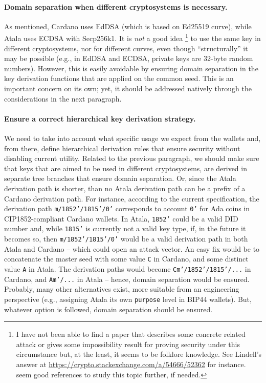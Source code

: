 \paragraph{Domain separation when different cryptosystems is
  necessary.} %
As mentioned, Cardano uses EdDSA (which is based on Ed25519 curve),
while Atala uses ECDSA with Secp256k1. It is \emph{not} a good idea%
\footnote{I have not been able to find a paper that describes
  some concrete related attack or gives some impossibility result for
  proving security under this circumstance but, at the least, it seems to
  be folklore knowledge. See Lindell's answer at
  \url{https://crypto.stackexchange.com/a/54666/52362} for instance.
  \cite{dlp12+,thorm21} seem good references to study this topic further, if
  needed.} to use the same key in different cryptosystems, nor for different
curves, even though ``structurally'' it may be possible (e.g., in EdDSA and
ECDSA, private keys are 32-byte random numbers). However, this is easily
avoidable by ensuring domain separation in the key derivation functions that
are applied on the common seed. This is an important concern on its own; yet,
it should be addressed natively through the considerations in the next
paragraph.

\paragraph{Ensure a correct hierarchical key derivation strategy.} %
We need to take into account what specific usage we expect from the wallets
and, from there, define hierarchical derivation rules that ensure security
without disabling current utility. Related to the previous paragraph, we should
make sure that keys that are aimed to be used in different
cryptosystems, are derived in separate tree branches that ensure domain
separation. Or, since the Atala derivation path is shorter, than no Atala
derivation path can be a prefix of a Cardano derivation path. For instance,
according to the current specification, the derivation path
\texttt{m/1852'/1815'/0'} corresponds to account \texttt{0'} for Ada coins in
CIP1852-compliant Cardano wallets. In Atala, \texttt{1852'} could be a valid
DID number and, while \texttt{1815'} is currently not a valid key type, if,
in the future it becomes so, then \texttt{m/1852'/1815'/0'} would be a valid
derivation path in both Atala and Cardano -- which could open an attack vector.
An easy fix would be to concatenate the master seed with some value \texttt{C}
in Cardano, and some distinct value \texttt{A} in Atala. The derivation paths would
become \texttt{Cm'/1852'/1815'/...} in Cardano, and \texttt{Am'/...} in Atala
-- hence, domain separation would be ensured. Probably, many other alternatives
exist, more suitable from an engineering perspective (e.g., assigning Atala its
own \texttt{purpose} level in BIP44 wallets). But, whatever option is followed,
domain separation should be ensured.


